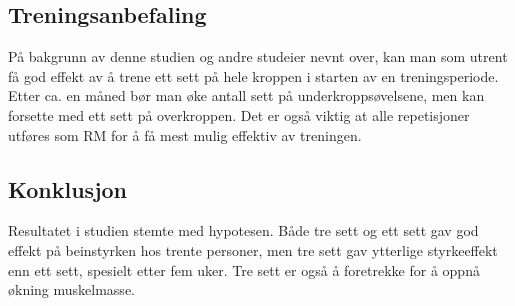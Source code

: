 \documentclass[
]{book}
\begin{document}
\hypertarget{treningsanbefaling}{%
\subsection{Treningsanbefaling}\label{treningsanbefaling}}

På bakgrunn av denne studien og andre studeier nevnt over, kan man som utrent få god effekt av å trene ett sett på hele kroppen i starten av en treningsperiode. Etter ca. en måned bør man øke antall sett på underkroppsøvelsene, men kan forsette med ett sett på overkroppen. Det er også viktig at alle repetisjoner utføres som RM for å få mest mulig effektiv av treningen.

\hypertarget{konklusjon}{%
\subsection{Konklusjon}\label{konklusjon}}

Resultatet i studien stemte med hypotesen. Både tre sett og ett sett gav god effekt på beinstyrken hos trente personer, men tre sett gav ytterlige styrkeeffekt enn ett sett, spesielt etter fem uker. Tre sett er også å foretrekke for å oppnå økning muskelmasse.

  
\end{document}

